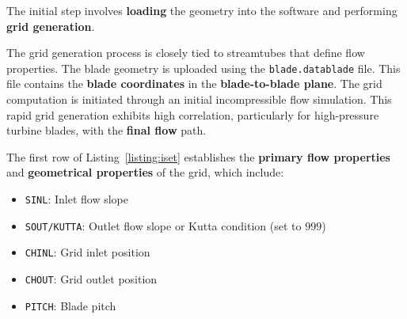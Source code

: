 


The initial step involves \textbf{loading} the geometry into the software and performing \textbf{grid generation}. 

The grid generation process is closely tied to streamtubes that define flow properties. The blade geometry is uploaded using the \texttt{blade.datablade} file. 
This file contains the \textbf{blade coordinates} in the \textbf{blade-to-blade plane}. The grid computation is initiated through an initial incompressible flow simulation. 
This rapid grid generation exhibits high correlation, particularly for high-pressure turbine blades, with the \textbf{final flow} path.



The first row of Listing~\ref{listing:iset} establishes the \textbf{primary flow properties} and \textbf{geometrical properties} of the grid, which include:

\begin{itemize}
    \item \texttt{SINL}: Inlet flow slope
    \item \texttt{SOUT/KUTTA}: Outlet flow slope or Kutta condition (set to $999$)
    \item \texttt{CHINL}: Grid inlet position
    \item \texttt{CHOUT}: Grid outlet position
    \item \texttt{PITCH}: Blade pitch
\end{itemize}

